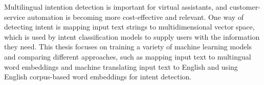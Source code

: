 Multilingual intention detection is important for virtual assistants, and customer-service automation is becoming more cost-effective and relevant. One way of detecting intent is mapping input text strings to multidimensional vector space, which is used by intent classification models to supply users with the information they need. This thesis focuses on training a variety of machine learning models and comparing different approaches, such as mapping input text to multingual word embeddings and machine translating input text to English and using English corpus-based word embeddings for intent detection.


